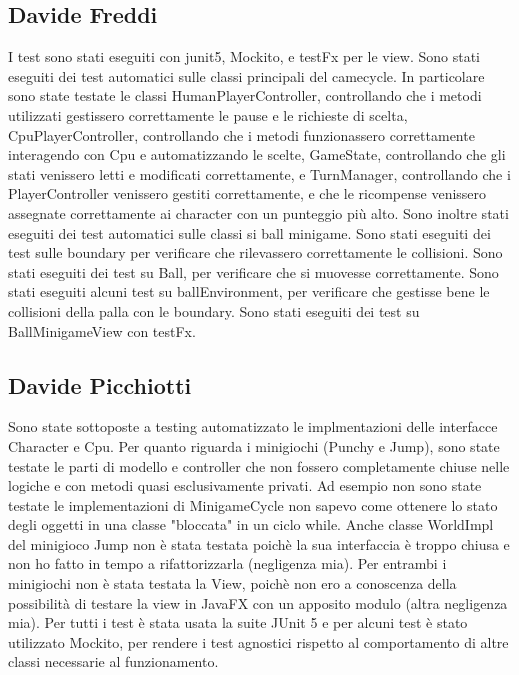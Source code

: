 \documentclass[a4paper,12pt]{report}
\begin{document}
	\subsection{Davide Freddi}
	I test sono stati eseguiti con junit5, Mockito, e testFx per le view.
    Sono stati eseguiti dei test automatici sulle classi principali del camecycle.
    In particolare sono state testate le classi HumanPlayerController, controllando che i metodi utilizzati gestissero correttamente le pause e le richieste di scelta, CpuPlayerController, controllando che i metodi funzionassero correttamente interagendo con Cpu e automatizzando le scelte, GameState, controllando che gli stati venissero letti e modificati correttamente, e TurnManager, controllando che i PlayerController venissero gestiti correttamente, e che le ricompense venissero assegnate correttamente ai character con un punteggio più alto.
    Sono inoltre stati eseguiti dei test automatici sulle classi si ball minigame.
    Sono stati eseguiti dei test sulle boundary per verificare che rilevassero correttamente le collisioni.
    Sono stati eseguiti dei test su Ball, per verificare che si muovesse correttamente.
    Sono stati eseguiti alcuni test su ballEnvironment, per verificare che gestisse bene le collisioni della palla con le boundary.
    Sono stati eseguiti dei test su BallMinigameView con testFx.
	\subsection{Davide Picchiotti}

    Sono state sottoposte a testing automatizzato le implmentazioni delle interfacce Character e Cpu.
    Per quanto riguarda i minigiochi (Punchy e Jump), sono state testate le parti di modello e controller che
    non fossero completamente chiuse nelle logiche e con metodi quasi esclusivamente privati.\newline
    Ad esempio non sono state testate le implementazioni di MinigameCycle non sapevo come ottenere lo stato degli oggetti
    in una classe "bloccata" in un ciclo while.\newline
    Anche classe WorldImpl del minigioco Jump non è stata testata poichè la sua interfaccia è troppo chiusa e non ho fatto in tempo a
    rifattorizzarla (negligenza mia).\newline
    Per entrambi i minigiochi non è stata testata la View, poichè non ero a conoscenza della possibilità di testare la view in JavaFX con
    un apposito modulo (altra negligenza mia).\newline
    \newline
    Per tutti i test è stata usata la suite JUnit 5 e per alcuni test è stato utilizzato Mockito, per rendere i test agnostici
    rispetto al comportamento di altre classi necessarie al funzionamento.
\end{document}
